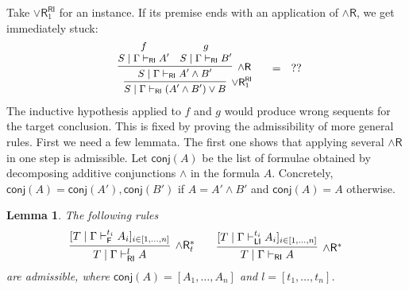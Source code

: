 \documentclass[submission,copyright,creativecommons]{eptcs}
\newtheorem{lemma}[theorem]{Lemma}
\theoremstyle{definition}
\newtheorem{defn}{Definition}[section]
\newcommand{\andr}{\land \mathsf{R}}
\newcommand{\orrone}{\lor \mathsf{R}_{1}}
\newcommand{\RI}{\mathsf{RI}}
\newcommand{\LI}{\mathsf{LI}}
\newcommand{\F}{\mathsf{F}}
\newcommand{\conj}[1]{\mathsf{conj} (#1)}
\newcommand{\proofbox}[1]{\begin{tabular}{l} #1 \end{tabular}}
\newcommand\niccolo[1]{\mbox{}
{\marginpar{\color{red}NV}}
{\sf\noindent\color{red}#1}}%
\begin{document}
Take $\orrone^{\RI}$ for an instance. If its premise ends with an application of $\andr$, we get immediately stuck:
\begin{displaymath}
  \begin{array}{c}
    \small
    \proofbox{
    \infer[\orrone^{\RI}]{S \mid \Gamma \vdash_{\RI} (A' \land B') \lor B}{
      \infer[\andr]{S \mid \Gamma \vdash_{\RI} A' \land B'}{
        \deduce{S \mid \Gamma \vdash_{\RI} A'}{f}
        &
        \deduce{S \mid \Gamma \vdash_{\RI} B'}{g}
      }
    }
    }
    \quad
    =
    \quad
    ??
  \end{array}
\end{displaymath}
The inductive hypothesis applied to $f$ and $g$ would produce wrong sequents for the target conclusion.
This is fixed by proving the admissibility of more general rules. First we need a few lemmata. 
The first one shows that applying several $\andr$ in one step is admissible.
  Let $\conj{A}$ be the list of formulae obtained by decomposing additive conjunctions $\land$ in the formula $A$. Concretely, $\conj{A} = \conj{A'} , \conj{B'}$ if $A = A' \land B'$ and $\conj{A} = A$ otherwise.
\begin{lemma}\label{lem:BigStep}
  The following rules
  \begin{displaymath}
    \infer[\andr^{*}_t]{T \mid \Gamma \vdash^{l}_{\RI} A}{
      [T \mid \Gamma \vdash^{t_i}_{\F} A_i]_{i \in [1 , \dots , n]}
    }
    \qquad
    \infer[\andr^{*}]{T \mid \Gamma \vdash_{\RI} A}{
      [T \mid \Gamma \vdash^{t_i}_{\LI} A_i]_{i \in [1 , \dots , n]}
    }
  \end{displaymath}
  are admissible, where $\conj{A} = [A_1 , \dots , A_n]$ and $l = [t_1 , \dots , t_n]$.
\end{lemma}
\end{document}
